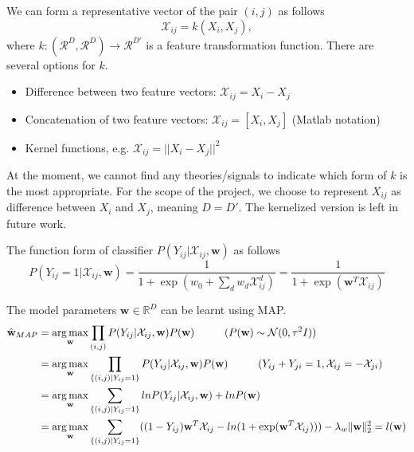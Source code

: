 We can form a representative vector of the pair $(i, j)$ as follows
\begin{equation}
	\mathcal{X}_{ij} = k (X_i, X_j),
\end{equation}
where $k: (\mathcal{R}^D, \mathcal{R}^D) \rightarrow \mathcal{R}^{D'}$ is a feature transformation function. There are several options for $k$. 
\begin{itemize}
	\item Difference between two feature vectors: $\mathcal{X}_{ij} = X_i - X_j$
	\item Concatenation of two feature vectors:  $\mathcal{X}_{ij} = [X_i, X_j]$ (Matlab notation)
	\item Kernel functions, e.g. $\mathcal{X}_{ij} = || X_i - X_j ||^2$
\end{itemize}
At the moment, we cannot find any theories/signals to indicate which form of $k$ is the most appropriate. For the scope of the project, we choose to represent $X_{ij}$ as difference between $X_i$ and $X_j$, meaning $D = D'$. The kernelized version is left in future work. 

The function form of classifier $P(Y_{ij}|\mathcal{X}_{ij}, \textbf{w})$ as follows
 \begin{equation}
	 P(Y_{ij}=1|\mathcal{X}_{ij}, \textbf{w}) = \frac{1}{1 + \exp ( w_0 + \sum_d w_d \mathcal{X}_{ij}^d )} = \frac{1}{1 + \exp (\textbf{w}^T \mathcal{X}_{ij})}
 \end{equation}
 
The model parameters $\textbf{w} \in \mathbb{R}^D$ can be learnt using MAP.
\begin{align}
	\label{eqn:objFuncLR}
	\hat{\textbf{w}}_{MAP} &= \operatorname*{arg\,max}_{\textbf{w}} \prod_{(i,j)} P(Y_{ij}| \mathcal{X}_{ij}, \textbf{w}) P(\textbf{w}) \hspace{1 cm} \text{($P(\textbf{w}) \sim \mathcal{N} (0, \tau^2 I) $)}\\ \notag
	&= \operatorname*{arg\,max}_{\textbf{w}} \prod_{\{(i,j)|Y_{ij}=1\}} P(Y_{ij}| \mathcal{X}_{ij}, \textbf{w}) P(\textbf{w}) \hspace{1 cm} \text{($Y_{ij} + Y_{ji} = 1, \mathcal{X}_{ij} = - \mathcal{X}_{ji}$)}\\ \notag
	&= \operatorname*{arg\,max}_{\textbf{w}} \sum_{\{(i,j)|Y_{ij}=1\}} ln P(Y_{ij}| \mathcal{X}_{ij}, \textbf{w}) + ln P(\textbf{w}) \\ \notag
	&= \operatorname*{arg\,max}_{\textbf{w}} \sum_{\{(i,j)|Y_{ij}=1\}} ( (1 - Y_{ij})\textbf{w}^T\mathcal{X}_{ij} - ln(1 + \exp(\textbf{w}^T\mathcal{X}_{ij}))) - \lambda_w \|\textbf{w} \|^2_2 = l(\textbf{w})
\end{align}

